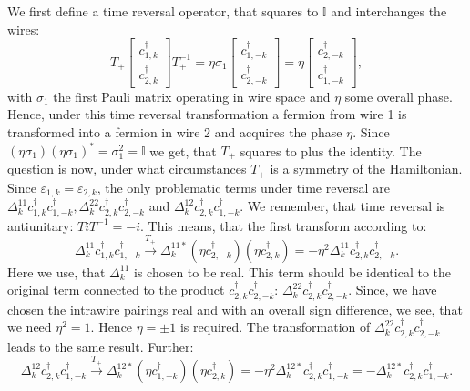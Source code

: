 We first define a time reversal operator, that squares to $\mathbb{I}$ and interchanges the wires: 
\begin{equation}
T_+\begin{bmatrix} c^\dagger_{1,k} \\ c^\dagger_{2,k} \end{bmatrix} T_+^{-1} = \eta\sigma_1 \begin{bmatrix} c^\dagger_{1,-k} \\ c^\dagger_{2,-k} \end{bmatrix} = \eta\begin{bmatrix} c^\dagger_{2,-k} \\ c^\dagger_{1,-k} \end{bmatrix},\nonumber
\end{equation} 
with $\sigma_1$ the first Pauli matrix operating in wire space and $\eta$ some overall phase. Hence, under this time reversal transformation a fermion from wire 1 is transformed into a fermion in wire 2 and acquires the phase $\eta$. Since $(\eta\sigma_1)(\eta\sigma_1)^* = \sigma_1^2 = \mathbb{I}$ we get, that $T_+$ squares to plus the identity. The question is now, under what circumstances $T_+$ is a symmetry of the Hamiltonian. Since $\varepsilon_{1,k} = \varepsilon_{2,k}$, the only problematic terms under time reversal are $\Delta^{11}_k c^\dagger_{1,k}c^\dagger_{1,-k}, \Delta^{22}_k c^\dagger_{2,k}c^\dagger_{2,-k}$ and $\Delta^{12}_kc^\dagger_{2,k}c^\dagger_{1,-k}$. We remember, that time reversal is antiunitary: $TiT^{-1} = -i$. This means, that the first transform according to:
\begin{equation}
\Delta^{11}_k c^\dagger_{1,k}c^\dagger_{1,-k} \overset{T_+}{\to} \Delta^{11*}_k \left(\eta c^\dagger_{2,-k}\right)\left(\eta c^\dagger_{2,k}\right) = -\eta^2\Delta^{11}_k c^\dagger_{2,k}c^\dagger_{2,-k}. \nonumber
\end{equation}
Here we use, that $\Delta^{11}_k$ is chosen to be real. This term should be identical to the original term connected to the product $c^\dagger_{2,k}c^\dagger_{2,-k}$: $\Delta^{22}_k c^\dagger_{2,k}c^\dagger_{2,-k}$. Since, we have chosen the intrawire pairings real and with an overall sign difference, we see, that we need $\eta^2 = 1$. Hence $\eta = \pm 1$ is required. The transformation of $\Delta^{22}_k c^\dagger_{2,k}c^\dagger_{2,-k}$ leads to the same result. Further:
\begin{equation}
\Delta^{12}_k c^\dagger_{2,k}c^\dagger_{1,-k} \overset{T_+}{\to} \Delta^{12*}_k \left(\eta c^\dagger_{1,-k}\right)\left( \eta c^\dagger_{2,k}\right) = -\eta^2 \Delta^{12*}_k c^\dagger_{2,k}c^\dagger_{1,-k} = - \Delta^{12*}_k c^\dagger_{2,k}c^\dagger_{1,-k}. \nonumber
\end{equation}
